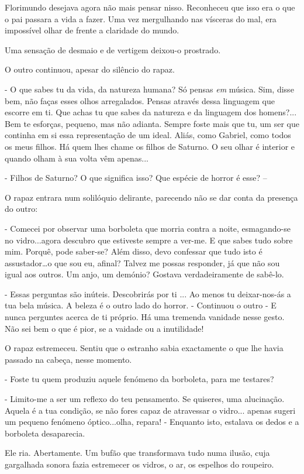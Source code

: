 Florimundo desejava agora não mais pensar nisso. Reconheceu que isso era
o que o pai passara a vida a fazer. Uma vez mergulhando nas vísceras do
mal, era impossível olhar de frente a claridade do mundo.

Uma sensação de desmaio e de vertigem deixou-o prostrado.

O outro continuou, apesar do silêncio do rapaz.

- O que sabes tu da vida, da natureza humana? Só pensas \emph{em}
música. Sim, disse bem, não faças esses olhos arregalados. Pensas
através dessa linguagem que escorre em ti. Que achas tu que sabes da
natureza e da linguagem dos homens?... Bem te esforças, pequeno, mas não
adianta. Sempre foste mais que tu, um ser que continha em si essa
representação de um ideal. Aliás, como Gabriel, como todos os meus
filhos. Há quem lhes chame os filhos de Saturno. O seu olhar é interior
e quando olham à sua volta vêm apenas...

- Filhos de Saturno? O que significa isso? Que espécie de horror é esse?
--

O rapaz entrara num solilóquio delirante, parecendo não se dar conta da
presença do outro:

- Comecei por observar uma borboleta que morria contra a noite,
esmagando-se no vidro...agora descubro que estiveste sempre a ver-me. E
que sabes tudo sobre mim. Porquê, pode saber-se? Além disso, devo
confessar que tudo isto é assustador\ldots{}o que sou eu, afinal? Talvez
me possas responder, já que não sou igual aos outros. Um anjo, um
demónio? Gostava verdadeiramente de sabê-lo.

- Essas perguntas são inúteis. Descobrirás por ti ... Ao menos tu
deixar-nos-ás a tua bela música. A beleza é o outro lado do horror. -
Continuou o outro - E nunca perguntes acerca de ti próprio. Há uma
tremenda vanidade nesse gesto. Não sei bem o que é pior, se a vaidade ou
a inutilidade!

O rapaz estremeceu. Sentiu que o estranho sabia exactamente o que lhe
havia passado na cabeça, nesse momento.

- Foste tu quem produziu aquele fenómeno da borboleta, para me testares?

- Limito-me a ser um reflexo do teu pensamento. Se quiseres, uma
alucinação. Aquela é a tua condição, se não fores capaz de atravessar o
vidro... apenas sugeri um pequeno fenómeno óptico...olha, repara! -
Enquanto isto, estalava os dedos e a borboleta desaparecia.

Ele ria. Abertamente. Um bufão que transformava tudo numa ilusão, cuja
gargalhada sonora fazia estremecer os vidros, o ar, os espelhos do
roupeiro.

